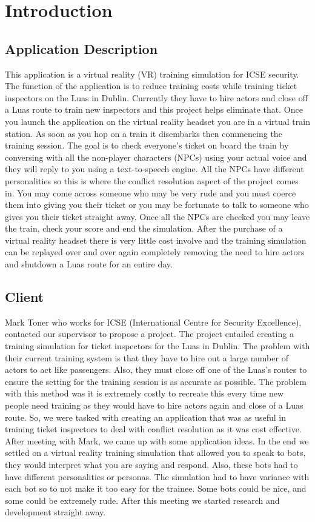 \chapter{Introduction}

\section{Application Description}
This application is a virtual reality (VR) training simulation for ICSE security. The function of the application is to reduce training costs while training ticket inspectors on the Luas in Dublin. Currently they have to hire actors and close off a Luas route to train new inspectors and this project helps eliminate that. Once you launch the application on the virtual reality headset you are in a virtual train station. As soon as you hop on a train it disembarks then commencing the training session. The goal is to check everyone's ticket on board the train by conversing with all the non-player characters (NPCs) using your actual voice and they will reply to you using a text-to-speech engine. All the NPCs have different personalities so this is where the conflict resolution aspect of the project comes in. You may come across someone who may be very rude and you must coerce them into giving you their ticket or you may be fortunate to talk to someone who gives you their ticket straight away. Once all the NPCs are checked you may leave the train, check your score and end the simulation. After the purchase of a virtual reality headset there is very little cost involve and the training simulation can be replayed over and over again completely removing the need to hire actors and shutdown a Luas route for an entire day.  

\section{Client}
Mark Toner who works for ICSE (International Centre for Security Excellence), contacted our supervisor to propose a project. The project entailed creating a training simulation for ticket inspectors for the Luas in Dublin. The problem with their current training system is that they have to hire out a large number of actors to act like passengers. Also, they must close off one of the Luas's routes to ensure the setting for the training session is as accurate as possible. The problem with this method was it is extremely costly to recreate this every time new people need training as they would have to hire actors again and close of a Luas route. So, we were tasked with creating an application that was as useful in training ticket inspectors to deal with conflict resolution as it was cost effective. After meeting with Mark, we came up with some application ideas. In the end we settled on a virtual reality training simulation that allowed you to speak to bots, they would interpret what you are saying and respond. Also, these bots had to have different personalities or personas. The simulation had to have variance with each bot so to not make it too easy for the trainee. Some bots could be nice, and some could be extremely rude. After this meeting we started research and development straight away.

